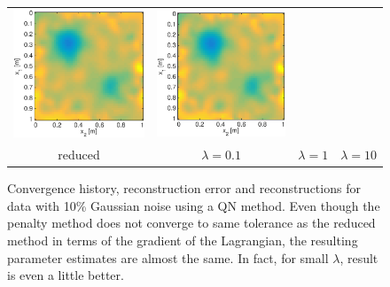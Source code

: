 \documentclass{iopart}
\begin{document}
\begin{figure}
\begin{tabular}{cccc}
\includegraphics[scale=.2]{./figs/2D_exp3_h}&
\includegraphics[scale=.2]{./figs/2D_exp3_i}\\
{\small reduced}&{\small $\lambda=0.1$}&{\small $\lambda=1$}&{\small $\lambda=10$}\\
\end{tabular}
\caption{Convergence history, reconstruction error and reconstructions for data with 10\% Gaussian noise using a QN method. Even though the penalty method does not converge to same tolerance as the reduced method in terms of the gradient of the Lagrangian, the resulting parameter estimates are almost the same. In fact, for small $\lambda$, result is even a little better.}
\label{fig:2D_exp3}
\end{figure}
\end{document}
